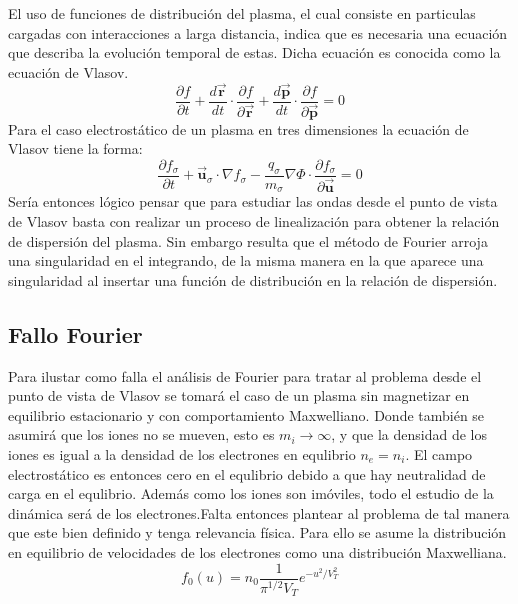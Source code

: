 \documentclass[../tesis_main_file.tex]{subfiles}
\begin{document}
El uso de funciones de distribución del plasma, el cual consiste en particulas cargadas con interacciones a larga distancia, indica que es necesaria una ecuación que describa la evolución temporal de estas. Dicha ecuación es conocida como la ecuación de Vlasov.\cite{bellan2008fundamentals}\\
\begin{equation}
\label{eq:vlasov_def}
\frac{\partial f}{\partial t} + \frac{d\overrightarrow{\textbf{r}}}{dt}\cdot \frac{\partial f}{\partial \overrightarrow{\textbf{r}}} + \frac{d \overrightarrow{\textbf{p}}}{dt}\cdot \frac{\partial f}{\partial \overrightarrow{\textbf{p}}}=0
\end{equation}
Para el caso electrostático de un plasma en tres dimensiones la ecuación de Vlasov tiene la forma:
\begin{equation}
\label{eq:vlasov-poisson_3D}
\frac{\partial f_{\sigma}}{\partial t} + \overrightarrow{\textbf{u}}_{\sigma} \cdot \nabla f_{\sigma} -\frac{q_{\sigma}}{m_{\sigma}}\nabla \Phi \cdot \frac{\partial f_{\sigma}}{\partial \overrightarrow{\textbf{u}}}=0
\end{equation}
Sería entonces lógico pensar que para estudiar las ondas desde el punto de vista de Vlasov basta con realizar un proceso de linealización para obtener la relación de dispersión del plasma. Sin embargo resulta que el método de Fourier arroja una singularidad en el integrando, de la misma manera en la que aparece una singularidad al insertar una función de distribución en la relación de dispersión.\\
\subsection*{Fallo Fourier}
Para ilustar como falla el análisis de Fourier para tratar al problema desde el punto de vista de Vlasov se tomará el caso de un plasma sin magnetizar en equilibrio estacionario y con comportamiento Maxwelliano. Donde también se asumirá que los iones no se mueven, esto es $m_i \to \infty$, y que la densidad de los iones es igual a la densidad de los electrones en equlibrio $n_e =n_i$. El campo electrostático es entonces cero en el equlibrio debido a que hay neutralidad de carga en el equlibrio. Además como los iones son imóviles, todo el estudio de la dinámica será de los electrones.Falta entonces plantear al problema de tal manera que este bien definido y tenga relevancia física. Para ello se asume la distribución en equilibrio de velocidades de los electrones como una distribución Maxwelliana.
\begin{equation}
f_0(u)=n_0\frac{1}{\pi^{1/2}V_T}e^{-u^2/V_T^2}
\end{equation}
\end{document}
